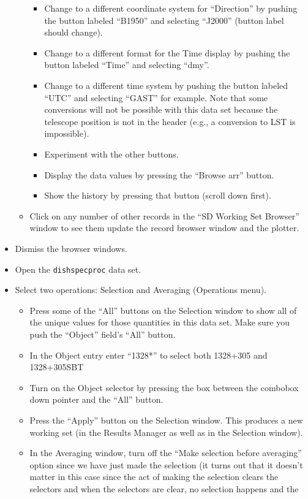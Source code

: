 \begin{itemize}
\begin{itemize}
\begin{itemize}
\item Change to a different coordinate system for ``Direction'' by pushing
the button labeled ``B1950'' and selecting ``J2000'' (button label should
change).
\item Change to a different format for the Time display by pushing the
button labeled ``Time'' and selecting ``dmy''.
\item Change to a different time system by pushing the button labeled
``UTC'' and selecting ``GAST'' for example.  Note that some conversions
will not be possible with this data set because the telescope position is
not in the header (e.g., a conversion to LST is impossible).
\item Experiment with the other buttons.
\item Display the data values by pressing the ``Browse arr'' button.
\item Show the history by pressing that button (scroll down first).
\end{itemize}
\item Click on any number of other records in the ``SD Working Set Browser''
window to see them update the record browser window and the plotter.
\end{itemize}
\item Dismiss the browser windows.
\item Open the {\tt dishspecproc} data set.
\item Select two operations: Selection and Averaging (Operations menu).
\begin{itemize}
\item Press some of the ``All'' buttons on the Selection window to show all 
of the unique values for those quantities in this data set.  Make sure you
push the ``Object'' field's ``All'' button.
\item In the Object entry enter ``1328*'' to select both 1328+305 and 
1328+305SBT
\item Turn on the Object selector by pressing the box between the combobox down
pointer and the ``All'' button.
\item Press the ``Apply'' button on the Selection window.  This produces a
new working set (in the Results Manager as well as in the Selection window).
\item In the Averaging window, turn off the ``Make selection before averaging'' option
since we have just made the selection (it turns out that it doesn't
matter in this case since the act of making the selection clears the
selectors and when the selectors are clear, no selection happens and the

\end{itemize}
\end{itemize}
